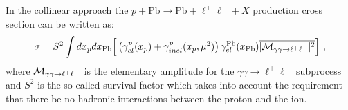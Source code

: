 %
% 
%


In the collinear approach the $p+\textrm{Pb}\rightarrow \textrm{Pb} + \ell^+\ell^- + X$ production cross section can be written as:
%
\begin{equation}
\sigma 
= S^2 \int dx_p dx_{\rm Pb} \Big[
\left ( \gamma^{p}_{el}(x_p) + \gamma^{p}_{inel}(x_p,\mu^2) \right)
 \gamma^{\rm Pb}_{el}(x_{\rm Pb})
\overline{ |{\cal M}_{\gamma \gamma \rightarrow \ell^+ \ell^-}|^2 }\Big]~,
\label{collinear_factorization_formula}
\end{equation}
%
where ${\cal M}_{\gamma \gamma \rightarrow \ell^+ \ell^-}$
is the elementary amplitude for the $\gamma \gamma \rightarrow \ell^+ \ell^-$ subprocess and $S^2$ is the so-called survival factor which takes into account the requirement that there be no hadronic interactions between the proton and the ion.

